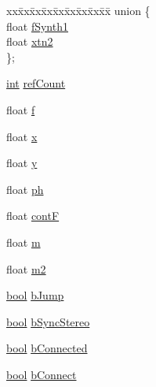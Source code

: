 \begin{DoxyCompactItemize}
\begin{tabbing}
\end{tabbing}\item 
\begin{tabbing}
xx\=xx\=xx\=xx\=xx\=xx\=xx\=xx\=xx\=\kill
union \{\\
\>float \hyperlink{class__sbsms___1_1_track_point_ad7700dbd8aaa0686b44e673e5bdbfc1e}{fSynth1}\\
\>float \hyperlink{class__sbsms___1_1_track_point_ad34d4ebef58e1601f17dd02c9f5a07a4}{xtn2}\\
\}; \\

\end{tabbing}\item 
\hyperlink{xmltok_8h_a5a0d4a5641ce434f1d23533f2b2e6653}{int} \hyperlink{class__sbsms___1_1_track_point_adb75b86c3b50e193a6158f372283fe35}{ref\+Count}
\item 
float \hyperlink{class__sbsms___1_1_track_point_a6e6b4b8a6a49334d10529fa6246506e0}{f}
\item 
float \hyperlink{class__sbsms___1_1_track_point_a4d4390a05eb813c6aefdb91df9c8be24}{x}
\item 
float \hyperlink{class__sbsms___1_1_track_point_a09a07b82ca2e04e64ea75deffeb7ff6f}{y}
\item 
float \hyperlink{class__sbsms___1_1_track_point_afa39d2e7c8f3ddc23e5ced47564ab01e}{ph}
\item 
float \hyperlink{class__sbsms___1_1_track_point_aec2e6027779bf3e67b3d5f44fad1c23a}{contF}
\item 
float \hyperlink{class__sbsms___1_1_track_point_a92dfdbd2db11a6f5f2218cc2933b8881}{m}
\item 
float \hyperlink{class__sbsms___1_1_track_point_a057cb31be565b9057bf2e2067013294c}{m2}
\item 
\hyperlink{mac_2config_2i386_2lib-src_2libsoxr_2soxr-config_8h_abb452686968e48b67397da5f97445f5b}{bool} \hyperlink{class__sbsms___1_1_track_point_ae337809570c1040e14fa32e8f445c804}{b\+Jump}
\item 
\hyperlink{mac_2config_2i386_2lib-src_2libsoxr_2soxr-config_8h_abb452686968e48b67397da5f97445f5b}{bool} \hyperlink{class__sbsms___1_1_track_point_affca68ae23911daf5b458fa947299d04}{b\+Sync\+Stereo}
\item 
\hyperlink{mac_2config_2i386_2lib-src_2libsoxr_2soxr-config_8h_abb452686968e48b67397da5f97445f5b}{bool} \hyperlink{class__sbsms___1_1_track_point_a3eaa9c8c84f1c1493e2de6058ad597d8}{b\+Connected}
\item 
\hyperlink{mac_2config_2i386_2lib-src_2libsoxr_2soxr-config_8h_abb452686968e48b67397da5f97445f5b}{bool} \hyperlink{class__sbsms___1_1_track_point_a10be7fd17a0d53c36c03a05738011c46}{b\+Connect}

\end{DoxyCompactItemize}
